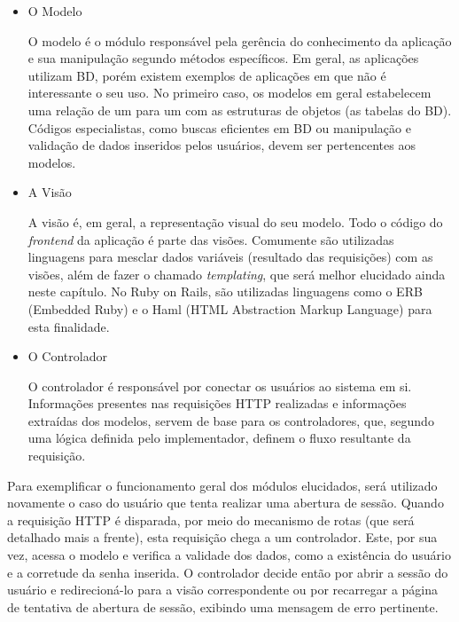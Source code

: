 \begin{itemize}

\item O Modelo

O modelo é o módulo responsável pela gerência do conhecimento da aplicação e sua manipulação segundo métodos específicos. Em geral, as aplicações utilizam BD, porém existem exemplos de aplicações em que não é interessante o seu uso. No primeiro caso, os modelos em geral estabelecem uma relação de um para um com as estruturas de objetos (as tabelas do BD). Códigos especialistas, como buscas eficientes em BD ou manipulação e validação de dados inseridos pelos usuários, devem ser pertencentes aos modelos.

\item A Visão

A visão é, em geral, a representação visual do seu modelo. Todo o código do \textit{frontend} da aplicação é parte das visões. Comumente são utilizadas linguagens para mesclar dados variáveis (resultado das requisições) com as visões, além de fazer o chamado \textit{templating}, que será melhor elucidado ainda neste capítulo. No Ruby on Rails, são utilizadas linguagens como o ERB (Embedded Ruby)
e o Haml (HTML Abstraction Markup Language)
para esta finalidade.

\item O Controlador

O controlador é responsável por conectar os usuários ao sistema em si. Informações presentes nas requisições HTTP realizadas e informações extraídas dos modelos, servem de base para os controladores, que, segundo uma lógica definida pelo implementador, definem o fluxo resultante da requisição.

\end{itemize}

Para exemplificar o funcionamento geral dos módulos elucidados, será utilizado novamente o caso do usuário que tenta realizar uma abertura de sessão. Quando a requisição HTTP é disparada, por meio do mecanismo de rotas (que será detalhado mais a frente), esta requisição chega a um controlador. Este, por sua vez, acessa o modelo e verifica a validade dos dados, como a existência do usuário e a corretude da senha inserida. O controlador decide então por abrir a sessão do usuário e redirecioná-lo para a visão correspondente ou por recarregar a página de tentativa de abertura de sessão, exibindo uma mensagem de erro pertinente.

